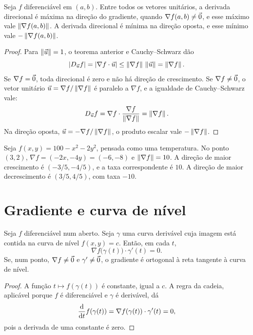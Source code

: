\documentclass[11pt,a4paper]{article}
\begin{document}

\begin{teorema}
Seja $f$ diferenciável em $(a,b)$. Entre todos os vetores unitários, a derivada direcional é máxima na direção do gradiente, quando $\nabla f(a,b)\neq\vec{0}$, e esse máximo vale $\left\lVert \nabla f(a,b) \right\rVert$. A derivada direcional é mínima na direção oposta, e esse mínimo vale $-\left\lVert \nabla f(a,b) \right\rVert$.
\end{teorema}

\begin{proof}
Para $\left\lVert \vec{u} \right\rVert=1$, o teorema anterior e Cauchy--Schwarz dão
\[
\left\lvert D_{\vec{u}} f \right\rvert=\left\lvert \nabla f\cdot\vec{u} \right\rvert\le\left\lVert \nabla f \right\rVert\,\left\lVert \vec{u} \right\rVert=\left\lVert \nabla f \right\rVert.
\]
Se $\nabla f=\vec{0}$, toda direcional é zero e não há direção de crescimento. Se $\nabla f\neq\vec{0}$, o vetor unitário $\vec{u}=\nabla f/\left\lVert \nabla f \right\rVert$ é paralelo a $\nabla f$, e a igualdade de Cauchy--Schwarz vale:
\[
D_{\vec{u}} f=\nabla f\cdot\frac{\nabla f}{\left\lVert \nabla f \right\rVert}=\left\lVert \nabla f \right\rVert.
\]
Na direção oposta, $\vec{u}=-\nabla f/\left\lVert \nabla f \right\rVert$, o produto escalar vale $-\left\lVert \nabla f \right\rVert$.
\end{proof}

\begin{exemplo}
Seja $f(x,y)=100-x^2-2y^2$, pensada como uma temperatura. No ponto $(3,2)$, $\nabla f=(-2x,-4y)=(-6,-8)$ e $\left\lVert \nabla f \right\rVert=10$. A direção de maior crescimento é $(-3/5,-4/5)$, e a taxa correspondente é $10$. A direção de maior decrescimento é $(3/5,4/5)$, com taxa $-10$.
\end{exemplo}

\section{Gradiente e curva de nível}

\begin{teorema}
Seja $f$ diferenciável num aberto. Seja $\gamma$ uma curva derivável cuja imagem está contida na curva de nível $f(x,y)=c$. Então, em cada $t$,
\[
\nabla f\bigl(\gamma(t)\bigr)\cdot\gamma'(t)=0.
\]
Se, num ponto, $\nabla f\neq\vec{0}$ e $\gamma'\neq\vec{0}$, o gradiente é ortogonal à reta tangente à curva de nível.
\end{teorema}

\begin{proof}
A função $t\mapsto f(\gamma(t))$ é constante, igual a $c$. A regra da cadeia, aplicável porque $f$ é diferenciável e $\gamma$ é derivável, dá
\[
\frac{\mathrm{d}}{\mathrm{d} t}f(\gamma(t))=\nabla f(\gamma(t))\cdot\gamma'(t)=0,
\]
pois a derivada de uma constante é zero.
\end{proof}
\end{document}

